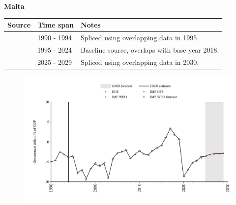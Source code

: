 \documentclass[12pt,a4paper,landscape]{article}
\begin{document}
\begin{adjustbox}{max totalsize={\paperwidth}{\paperheight},center}
\begin{minipage}[t][\textheight][t]{\textwidth}
\vspace*{0.5cm}
{}
\begin{center}
{\Large\bfseries Malta}
\end{center}
\vspace{0.5cm}
\begin{table}[H]
\centering
\small
\begin{tabular}{|l|l|l|}
\hline
\textbf{Source} & \textbf{Time span} & \textbf{Notes} \\
\hline
\rowcolor{white}\cite{IMF_GFS}& 1990 - 1994 &Spliced using overlapping data in 1995.\\
\rowcolor{lightgray}\cite{EUS}& 1995 - 2024 &Baseline source, overlaps with base year 2018.\\
\rowcolor{white}\cite{IMF_WEO_forecast}& 2025 - 2029 &Spliced using overlapping data in 2030.\\
\hline
\end{tabular}
\end{table}
\begin{figure}[H]
\centering
\includegraphics[width=\textwidth,height=0.6\textheight,keepaspectratio]{graphs/MLT_govdef_GDP.pdf}
\end{figure}
\end{minipage}
\end{adjustbox}
\end{document}
